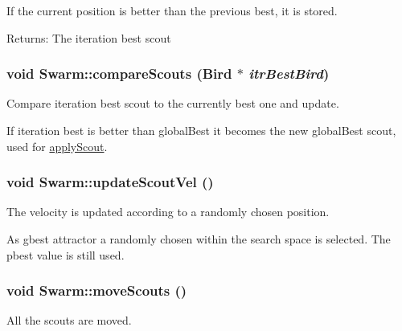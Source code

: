 If the current position is better than the previous best, it is stored. \begin{Desc}
\item[Returns:]The iteration best scout \end{Desc}
\hypertarget{classSwarm_a2b011c3d98a6f761691a0e52bec6001}{
\subsubsection{\setlength{\rightskip}{0pt plus 5cm}void Swarm::compareScouts ({\bf Bird} $\ast$ {\em itrBestBird})}}
\label{classSwarm_a2b011c3d98a6f761691a0e52bec6001}


Compare iteration best scout to the currently best one and update. 

If iteration best is better than globalBest it becomes the new globalBest scout, used for \hyperlink{classSwarm_8315401d37a75266d77f71a66660d1ae}{applyScout}. \hypertarget{classSwarm_9e891ddba8f8890e9f48a06067a76a73}{
\subsubsection{\setlength{\rightskip}{0pt plus 5cm}void Swarm::updateScoutVel ()}}
\label{classSwarm_9e891ddba8f8890e9f48a06067a76a73}


The velocity is updated according to a randomly chosen position. 

As gbest attractor a randomly chosen within the search space is selected. The pbest value is still used. \hypertarget{classSwarm_4fc3581725e33c1fe2d089f5980d3454}{
\subsubsection{\setlength{\rightskip}{0pt plus 5cm}void Swarm::moveScouts ()}}
\label{classSwarm_4fc3581725e33c1fe2d089f5980d3454}


All the scouts are moved. 


